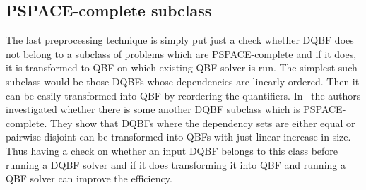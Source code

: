 \documentclass[
  digital, %
  twoside, %
  table,   %
  nolof,     %
  nolot,     %
]{fithesis3}
\theoremstyle{definition}
\theoremstyle{remark}
\begin{document}
\subsection{PSPACE-complete subclass}
The last preprocessing technique is simply put just a check whether DQBF does not belong to a subclass of problems which are PSPACE-complete and if it does, it is transformed to QBF on which existing QBF solver is run. The simplest such subclass would be those DQBFs whose dependencies are linearly ordered. Then it can be easily transformed into QBF by reordering the quantifiers. In~\cite{PSPACEsubclass} the authors investigated whether there is some another DQBF subclass which is PSPACE-complete. They show that DQBFs where the dependency sets are either equal or pairwise disjoint can be transformed into QBFs with just linear increase in size. Thus having a check on whether an input DQBF belongs to this class before running a DQBF solver and if it does transforming it into QBF and running a QBF solver can improve the efficiency.




\end{document}
